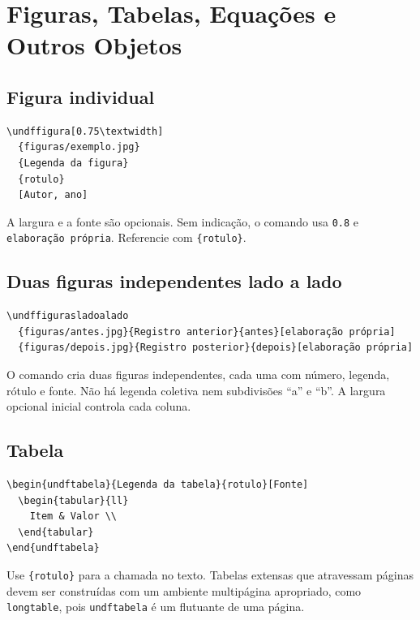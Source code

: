 \chapter{Figuras, Tabelas, Equações e Outros Objetos}

\section{Figura individual}

\begin{lstlisting}
\undffigura[0.75\textwidth]
  {figuras/exemplo.jpg}
  {Legenda da figura}
  {rotulo}
  [Autor, ano]
\end{lstlisting}

A largura e a fonte são opcionais. Sem indicação, o comando usa \texttt{0.8\string\textwidth} e \texttt{elaboração própria}. Referencie com \texttt{\string\figuraref\{rotulo\}}.

\section{Duas figuras independentes lado a lado}

\begin{lstlisting}
\undffigurasladoalado
  {figuras/antes.jpg}{Registro anterior}{antes}[elaboração própria]
  {figuras/depois.jpg}{Registro posterior}{depois}[elaboração própria]
\end{lstlisting}

O comando cria duas figuras independentes, cada uma com número, legenda, rótulo e fonte. Não há legenda coletiva nem subdivisões ``a'' e ``b''. A largura opcional inicial controla cada coluna.

\section{Tabela}

\begin{lstlisting}
\begin{undftabela}{Legenda da tabela}{rotulo}[Fonte]
  \begin{tabular}{ll}
    Item & Valor \\
  \end{tabular}
\end{undftabela}
\end{lstlisting}

Use \texttt{\string\tabelaref\{rotulo\}} para a chamada no texto. Tabelas extensas que atravessam páginas devem ser construídas com um ambiente multipágina apropriado, como \texttt{longtable}, pois \texttt{undftabela} é um flutuante de uma página.

